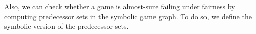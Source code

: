    Also, we can check whether  a game is almost-sure failing under fairness by computing predecessor sets in the symbolic game graph.  To do so, we define the symbolic version of the predecessor sets.
